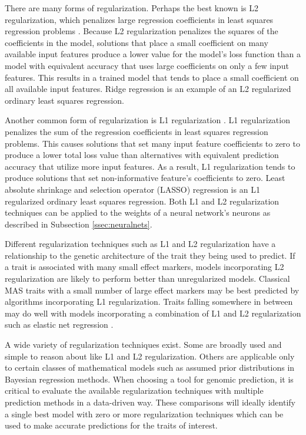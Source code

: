 There are many forms of regularization. Perhaps the best known is L2 regularization, 
which penalizes large regression coefficients in least squares regression 
problems \citep{tibshirani1996}. Because L2 regularization penalizes the squares of the coefficients 
in the model, solutions that place a small coefficient on many available input features 
produce a lower value for the model's loss function than a model with equivalent accuracy 
that uses large coefficients on only a few input features. This results in a trained
model that tends to place a small coefficient on all available input features.  Ridge regression
is an example of an L2 regularized ordinary least squares regression. 

Another common form of regularization is L1 regularization \citep{tibshirani1996}. 
L1 regularization penalizes the sum of the regression coefficients in least 
squares regression problems. This causes solutions that set many input feature 
coefficients to zero to produce a lower total loss value than alternatives 
with equivalent prediction accuracy that utilize more input features. 
As a result, L1 regularization tends to produce solutions that set non-informative 
feature's coefficients to zero. Least absolute shrinkage and selection operator 
(LASSO) regression is an L1 regularized ordinary least squares regression. Both L1 and L2
regularization techniques can be applied to the weights of a neural network's neurons
as described in Subsection \ref{ssec:neuralnets}.

Different regularization techniques such as L1 and L2 regularization have a relationship
to the genetic architecture of the trait they being used to predict. If a trait is associated 
with many small effect markers, models incorporating L2 regularization are likely 
to perform better than unregularized models. Classical MAS traits with a small 
number of large effect markers may be best predicted by algorithms 
incorporating L1 regularization. Traits falling somewhere in between may do well 
with models incorporating a combination of L1 and L2 regularization such as
elastic net regression \citep{zou2005}.

A wide variety of regularization techniques exist. Some are broadly used and simple
to reason about like L1 and L2 regularization. Others are applicable only to certain 
classes of mathematical models such as assumed prior distributions in Bayesian
regression methods. When choosing a tool for genomic prediction, it is critical to evaluate 
the available regularization techniques with multiple prediction methods in a data-driven way.
These comparisons will ideally identify a single best model with zero or more regularization techniques 
which can be used to make accurate predictions for the traits of interest. 

